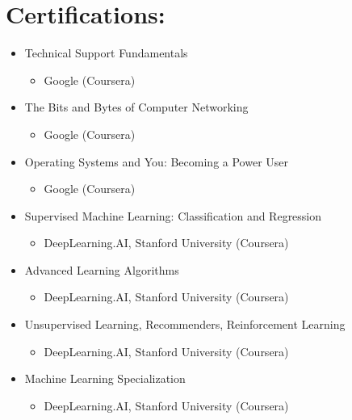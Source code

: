 \documentclass[12pt, oneside, a4paper]{article}
\begin{document}
    \section*{Certifications:}
    \begin{itemize}
    \item Technical Support Fundamentals 
        \begin{itemize}
            \item Google (Coursera)
        \end{itemize}
    \item The Bits and Bytes of Computer Networking
        \begin{itemize}
            \item Google (Coursera) 
        \end{itemize}
    \item Operating Systems and You: Becoming a Power User
        \begin{itemize}
            \item Google (Coursera) 
        \end{itemize}
    \item Supervised Machine Learning: Classification and Regression
        \begin{itemize}
            \item DeepLearning.AI, Stanford University (Coursera)
        \end{itemize}
    \item Advanced Learning Algorithms
        \begin{itemize}
            \item DeepLearning.AI, Stanford University (Coursera)
        \end{itemize}
    \item Unsupervised Learning, Recommenders, Reinforcement Learning
        \begin{itemize}
            \item DeepLearning.AI, Stanford University (Coursera)
        \end{itemize}
    \item Machine Learning Specialization
        \begin{itemize}
            \item DeepLearning.AI, Stanford University (Coursera)
        \end{itemize}
    \end{itemize}
\end{document}
